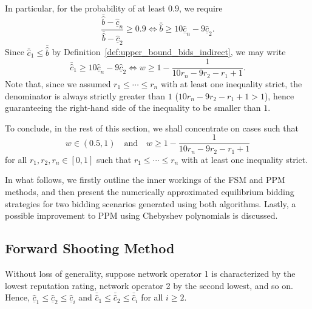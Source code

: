 In particular, for the probability of at least $0.9$, we require
\begin{equation*}
  \frac{\bar{\hat{b}} - \underline{\hat{c}}_n}{\bar{\hat{b}} - \underline{\hat{c}}_2} \geq 0.9 \iff \bar{\hat{b}}\geq 10\underline{\hat{c}}_n - 9\underline{\hat{c}}_2.
\end{equation*}
Since $\bar{\hat{c}}_1\leq \bar{\hat{b}}$ by Definition~\ref{def:upper_bound_bids_indirect}, we may write
\begin{equation*}
  \bar{\hat{c}}_1 \geq 10\underline{\hat{c}}_n - 9\underline{\hat{c}}_2 \iff w \geq 1 - \frac{1}{10r_n - 9r_2 - r_1 + 1}.
\end{equation*}
Note that, since we assumed $r_1\leq\cdots\leq r_n$ with at least one inequality strict, the denominator is always strictly greater than $1$ ($10r_n - 9r_2-r_1+1 > 1$), hence guaranteeing the right-hand side of the inequality to be smaller than $1$.

To conclude, in the rest of this section, we shall concentrate on cases such that
\begin{equation*}
  w \in (0.5, 1) \quad\textrm{and}\quad w \geq 1 - \frac{1}{10r_n - 9r_2 - r_1 + 1}
\end{equation*}
for all $r_1,r_2,r_n\in [0,1]$ such that $r_1\leq\cdots\leq r_n$ with at least one inequality strict.

In what follows, we firstly outline the inner workings of the FSM and PPM methods, and then present the numerically approximated equilibrium bidding strategies for two bidding scenarios generated using both algorithms. Lastly, a possible improvement to PPM using Chebyshev polynomials is discussed.

\subsection{Forward Shooting Method} %
\label{sub:forward_shooting_method_indirect}
Without loss of generality, suppose network operator 1 is characterized by the lowest reputation rating, network operator 2 by the second lowest, and so on. Hence, $\underline{\hat{c}}_1\leq \underline{\hat{c}}_2\leq \underline{\hat{c}}_i$ and $\bar{\hat{c}}_1\leq \bar{\hat{c}}_2\leq \bar{\hat{c}}_i$ for all $i\geq 2$.

